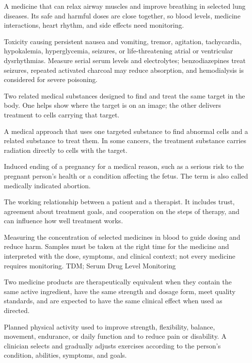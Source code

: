  A medicine that can relax airway muscles and improve breathing in selected lung diseases. Its safe and harmful doses are close together, so blood levels, medicine interactions, heart rhythm, and side effects need monitoring.

 Toxicity causing persistent nausea and vomiting, tremor, agitation, tachycardia, hypokalemia, hyperglycemia, seizures, or life-threatening atrial or ventricular dysrhythmias. Measure serial serum levels and electrolytes; benzodiazepines treat seizures, repeated activated charcoal may reduce absorption, and hemodialysis is considered for severe poisoning.

 Two related medical substances designed to find and treat the same target in the body. One helps show where the target is on an image; the other delivers treatment to cells carrying that target.

 A medical approach that uses one targeted substance to find abnormal cells and a related substance to treat them. In some cancers, the treatment substance carries radiation directly to cells with the target.

 Induced ending of a pregnancy for a medical reason, such as a serious risk to the pregnant person's health or a condition affecting the fetus. The term is also called medically indicated abortion.

 The working relationship between a patient and a therapist. It includes trust, agreement about treatment goals, and cooperation on the steps of therapy, and can influence how well treatment works.

 Measuring the concentration of selected medicines in blood to guide dosing and reduce harm. Samples must be taken at the right time for the medicine and interpreted with the dose, symptoms, and clinical context; not every medicine requires monitoring.
\synonyms
TDM; Serum Drug Level Monitoring

 Two medicine products are therapeutically equivalent when they contain the same active ingredient, have the same strength and dosage form, meet quality standards, and are expected to have the same clinical effect when used as directed.

 Planned physical activity used to improve strength, flexibility, balance, movement, endurance, or daily function and to reduce pain or disability. A clinician selects and gradually adjusts exercises according to the person’s condition, abilities, symptoms, and goals.

